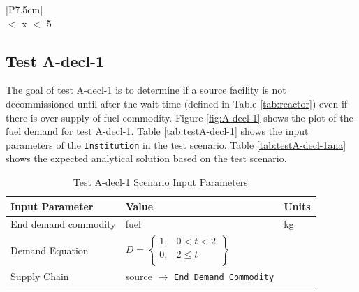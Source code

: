 \documentclass[11pt,letterpaper]{article}
\begin{document}
\begin{table}[H]
	\centering
	\caption{Test A-grow-1 Base Test Acceptance}
	\label{tab:test-A-grow-1 base}
	\begin{tabular}{|P{7.5cm}|}
		\hline
		\textbf{}\\
		 $<$ x $<$ 5 \\
		\hline
	\end{tabular}
\end{table}

\subsection{Test A-decl-1}
The goal of test A-decl-1 is to determine if a source facility is not decommissioned until after the wait time (defined in Table \ref{tab:reactor}) even if there is over-supply of fuel commodity. Figure \ref{fig:A-decl-1} shows the plot of the fuel demand for test A-decl-1. 
Table \ref{tab:testA-decl-1} shows the input parameters of the \texttt{Institution} in the test scenario. Table \ref{tab:testA-decl-1ana} shows the expected analytical solution based on the test scenario. 

\begin{table}[H]
	\centering
	\caption{Test A-decl-1 Scenario Input Parameters }
	\label{tab:test_A-decl-1}
	\begin{tabular}{|l|l|l|}
		\hline
		\textbf{Input Parameter} & \textbf{Value} & \textbf{Units} \\
		\hline
		End demand commodity & fuel & kg \\
		Demand Equation & $D = \left\{
		\begin{array}{ll}
			1 , & 0 < t < 2 \\
			0 , &  2 \leq t  \\
		\end{array}\right\}$
		& \\
		Supply Chain & source $\rightarrow$ \texttt{End Demand Commodity} &  \\
		\hline
		\end{tabular}
\end{table}
\end{document}
